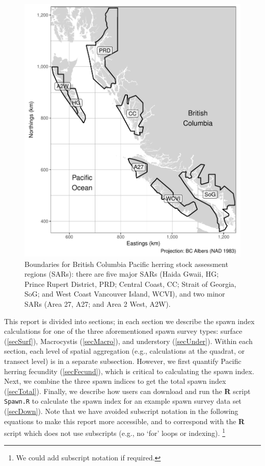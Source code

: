 \documentclass[12pt]{article}
\begin{document}
\begin{figure}
\centering
\includegraphics[width=\linewidth]{Figures/BC.pdf}
\caption[Boundaries for Pacific herring stock assessment regions (SARs)]
{Boundaries for British Columbia Pacific herring stock assessment regions (SARs): there are five major SARs (Haida Gwaii, HG; Prince Rupert District, PRD; Central Coast, CC; Strait of Georgia, SoG; and West Coast Vancouver Island, WCVI), and two minor SARs (Area 27, A27; and Area 2 West, A2W).}
\label{figBC}
\end{figure}

This report is divided into sections; in each section we describe the spawn index calculations for one of the three aforementioned spawn survey types: surface (\autoref{secSurf}), Macrocystis (\autoref{secMacro}), and understory (\autoref{secUnder}).
Within each section, each level of spatial aggregation (e.g., calculations at the quadrat, or transect level) is in a separate subsection.
However, we first quantify Pacific herring fecundity (\autoref{secFecund}), which is critical to calculating the spawn index.
Next, we combine the three spawn indices to get the total spawn index (\autoref{secTotal}).
Finally, we describe how users can download and run the \textbf{R} script \texttt{Spawn.R} to calculate the spawn index for an example spawn survey data set (\autoref{secDown}).
Note that we have avoided subscript notation in the following equations to make this report more accessible, and to correspond with the \textbf{R} script which does not use subscripts (e.g., no `for' loops or indexing).%
\footnote{We could add subscript notation if required.}
\end{document}
